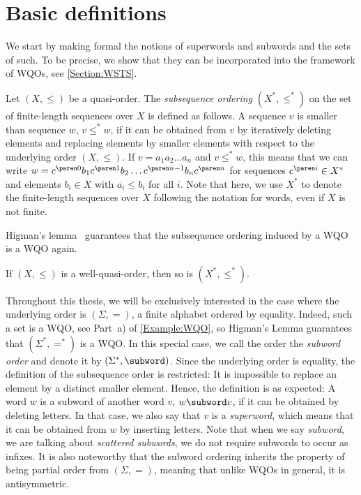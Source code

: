 \documentclass[../../diss.tex]{subfiles}
\begin{document}
\section{Basic definitions}%
\label{Closures:Defs}%

We start by making formal the notions of superwords and subwords and the sets of such.
To be precise, we show that they can be incorporated into the framework of WQOs, see \cref{Section:WSTS}.

Let $(X,\leq)$ be a quasi-order.
The \emph{subsequence ordering} $(X^*,\leq^*)$ on the set of finite-length sequences over $X$ is defined as follows.
A sequence $v$ is smaller than sequence $w$, $v \leq^* w$, if it can be obtained from $v$ by iteratively deleting elements and replacing elements by smaller elements with respect to the underlying order $(X,\leq)$.
If $v = a_1 a_2 \ldots a_n$ and $v \leq^* w$, this means that we can write
$w = \itr{c}{0} b_1 \itr{c}{1} b_2 \ldots \itr{c}{n-1} b_n \itr{c}{n}$ for sequences $\itr{c}{i} \in X^*$ and elements $b_i \in X$ with $a_i \leq b_i$ for all $i$.
Note that here, we use $X^*$ to denote the finite-length sequences over $X$ following the notation for words, even if $X$ is not finite.

Higman's lemma~\cite{Higman52} guarantees that the subsequence ordering induced by a WQO is a WQO again.

\begin{lemma}%
\label{Lemma:Higman}%
    If $(X,\leq)$ is a well-quasi-order, then so is $(X^*,\leq^*)$.
\end{lemma}

Throughout this thesis, we will be exclusively interested in the case where the underlying order is $(\Sigma,=)$, a finite alphabet ordered by equality.
Indeed, such a set is a WQO, see Part~a) of \cref{Example:WQO}, so Higman's Lemma guarantees that $(\Sigma^*,=^*)$ is a WQO.\@
In this special case, we call the order the \emph{subword order} and denote it by $(\Sigma^*,\subword)$.
Since the underlying order is equality, the definition of the subsequence order is restricted: It is impossible to replace an element by a distinct smaller element.
Hence, the definition is as expected: A word $w$ is a subword of another word $v$, $w \subword v$, if it can be obtained by deleting letters.
In that case, we also say that $v$ is a \emph{superword}, which means that it can be obtained from $w$ by inserting letters.
Note that when we say \emph{subword}, we are talking about \emph{scattered subwords}, \ie we do not require subwords to occur as infixes.
It is also noteworthy that the subword ordering inherits the property of being partial order from $(\Sigma,=)$, meaning that unlike WQOs in general, it is antisymmetric.
\end{document}
